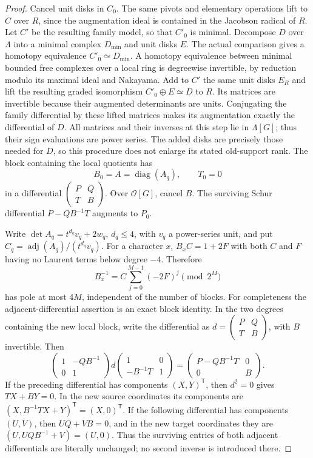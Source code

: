 \documentclass[11pt]{article}
\theoremstyle{definition}
\theoremstyle{remark}
\providecommand{\mathscr}[1]{\mathcal{#1}}
\begin{document}
\begin{proof}
Cancel unit disks in $C_0$. The same pivots and elementary operations
lift to $C$ over $R$, since the augmentation ideal is contained in
the Jacobson radical of $R$. Let $C'$ be the resulting family model,
so that $C'_0$ is minimal. Decompose $D$ over $\Lambda$ into a minimal
complex $D_{\min}$ and unit disks $E$. The actual comparison gives a
homotopy equivalence $C'_0\simeq D_{\min}$. A homotopy equivalence
between minimal bounded free complexes over a local ring is degreewise
invertible, by reduction modulo its maximal ideal and Nakayama.
Add to $C'$ the same unit disks $E_R$ and lift the resulting graded
isomorphism $C'_0\oplus E\simeq D$ to $R$. Its matrices are invertible
because their augmented determinants are units. Conjugating the
family differential by these lifted matrices makes its augmentation
exactly the differential of $D$. All matrices and their inverses at
this step lie in $\Lambda[G]$; thus their sign evaluations are power
series. The added disks are precisely those needed for $D$, so this
procedure does not enlarge its stated old-support rank.
The block containing the local quotients has
\[
 B_0=A=\operatorname{diag}(A_q),\qquad T_0=0
\]
in a differential $\left(\begin{smallmatrix}P&Q\\T&B\end{smallmatrix}\right)$.
Over $\mathscr O[G]$, cancel $B$. The surviving Schur differential
$P-QB^{-1}T$ augments to $P_0$.

Write $\det A_q=t^{d_q}v_q+2w_q$, $d_q\le4$, with $v_q$ a power-series
unit, and put
$C_q=\operatorname{adj}(A_q)/(t^{d_q}v_q)$.
For a character $x$, $B_xC=1+2F$ with both $C$ and $F$ having no
Laurent terms below degree $-4$. Therefore
\[
             B_x^{-1}=C\sum_{j=0}^{M-1}(-2F)^j\pmod {2^M}        \tag{5.8}
\]
has pole at most $4M$, independent of the number of blocks.
For completeness the adjacent-differential assertion is an exact
block identity. In the two degrees containing the new local block,
write the differential as
$d=\left(\begin{smallmatrix}P&Q\\T&B\end{smallmatrix}\right)$,
with $B$ invertible. Then
\[
 \begin{pmatrix}1&-QB^{-1}\\0&1\end{pmatrix}
 d\begin{pmatrix}1&0\\-B^{-1}T&1\end{pmatrix}
  =\begin{pmatrix}P-QB^{-1}T&0\\0&B\end{pmatrix}.
\]
If the preceding differential has components $(X,Y)^{\mathsf T}$,
then $d^2=0$ gives $TX+BY=0$. In the new source coordinates its
components are $(X,B^{-1}TX+Y)^{\mathsf T}=(X,0)^{\mathsf T}$.
If the following differential has components $(U,V)$, then
$UQ+VB=0$, and in the new target coordinates they are
$(U,UQB^{-1}+V)=(U,0)$. Thus the surviving entries of both adjacent
differentials are literally unchanged; no second inverse is
introduced there.


\end{proof}
\end{document}
